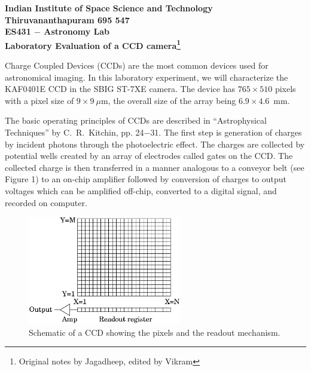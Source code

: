 \documentclass[a4paper,12pt]{article}
\begin{document}
\begin{center}
\Large
{\bf Indian Institute of Space Science and Technology} \\
{\bf Thiruvananthapuram 695 547} \\

\vspace*{5mm}
\Large
\textbf{ES431 $-$ Astronomy Lab} \\
\vspace*{0.5mm}
{\bf Laboratory Evaluation of a CCD camera\footnote{Original notes by Jagadheep, edited by Vikram}} \\
\end{center}

\vspace*{0.2cm}

\large

Charge Coupled Devices (CCDs) are the most common devices used for astronomical imaging. In this laboratory experiment, we will characterize the KAF0401E CCD in the SBIG ST-7XE camera. The device has $765 \times 510$ pixels with a pixel size of $9 \times 9~\mu$m, the overall size of the array being $6.9 \times 4.6$~mm.

The basic operating principles of CCDs are described in ``Astrophysical Techniques'' by C.~R.~Kitchin, pp. 24$-$31. The first step is generation of charges by incident photons through the photoelectric effect. The charges are collected by potential wells created by an array of electrodes called gates on the CCD. The collected charge is then transferred in a manner analogous to a conveyor belt (see Figure 1) to an on-chip amplifier followed by conversion of charges to output voltages which can be amplified off-chip, converted to a digital signal, and recorded on computer.

\begin{figure}[!htb]
\centering
\includegraphics[width=0.6\textwidth]{CCD.eps}
\caption{Schematic of a CCD showing the pixels and the readout mechanism.}
\end{figure}
\end{document}
